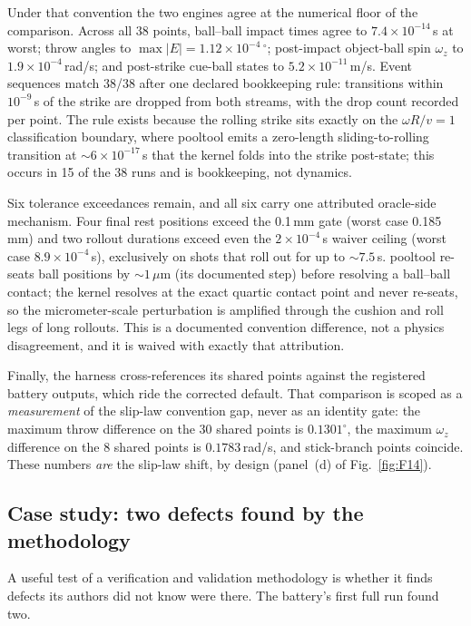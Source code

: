Under that convention the two engines agree at the numerical floor of the
comparison. Across all 38 points, ball--ball impact times agree to
$7.4\times10^{-14}$\,s at worst; throw angles to
$\max|E| = 1.12\times10^{-4}\,^\circ$; post-impact object-ball spin
$\omega_z$ to $1.9\times10^{-4}$\,rad/s; and post-strike cue-ball states
to $5.2\times10^{-11}$\,m/s. Event sequences match 38/38 after one
declared bookkeeping rule: transitions within $10^{-9}$\,s of the strike
are dropped from both streams, with the drop count recorded per point.
The rule exists because the rolling strike sits exactly on the
$\omega R/v = 1$ classification boundary, where pooltool emits a
zero-length sliding-to-rolling transition at ${\sim}6\times10^{-17}$\,s
that the kernel folds into the strike post-state; this occurs in 15 of
the 38 runs and is bookkeeping, not dynamics.

Six tolerance exceedances remain, and all six carry one attributed
oracle-side mechanism. Four final rest positions exceed the 0.1\,mm gate
(worst case 0.185\,mm) and two rollout durations exceed even the
$2\times10^{-4}$\,s waiver ceiling (worst case $8.9\times10^{-4}$\,s),
exclusively on shots that roll out for up to ${\sim}7.5$\,s. pooltool
re-seats ball positions by ${\sim}1\,\mu$m (its documented
 step) before resolving a ball--ball contact; the kernel
resolves at the exact quartic contact point and never re-seats, so the
micrometer-scale perturbation is amplified through the cushion and roll
legs of long rollouts. This is a documented convention difference, not a
physics disagreement, and it is waived with exactly that attribution.

Finally, the harness cross-references its shared points against the
registered battery outputs, which ride the corrected default. That
comparison is scoped as a \emph{measurement} of the slip-law convention
gap,
never as an identity gate: the maximum throw difference on the 30 shared
 points is $0.1301^\circ$, the maximum $\omega_z$ difference on
the 8 shared  points is $0.1783$\,rad/s, and stick-branch
points coincide. These numbers \emph{are} the slip-law shift, by design
(panel~(d) of Fig.~\ref{fig:F14}).

\subsection{Case study: two defects found by the methodology}

A useful test of a verification and validation methodology is whether it
finds defects its authors did not know were there. The battery's first
full run found two.

